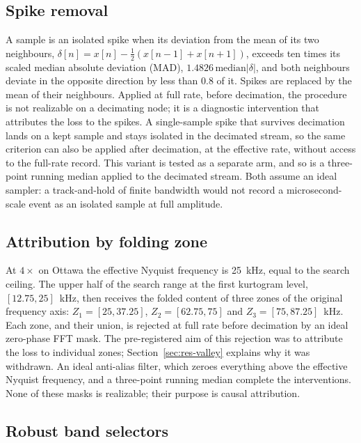 \subsection{Spike removal}
\label{sec:met-spikes}

A sample is an isolated spike when its deviation from the mean of its two neighbours,
$\delta[n] = x[n] - \tfrac12(x[n-1] + x[n+1])$, exceeds ten times
its scaled median absolute deviation (MAD), $1.4826\,\mathrm{median}|\delta|$, and both neighbours deviate in the opposite direction by less
than 0.8 of it. Spikes are replaced by the mean of their neighbours. Applied at full rate, before
decimation, the procedure is not realizable on a decimating node; it is a diagnostic intervention
that attributes the loss to the spikes. A single-sample spike that survives decimation lands on a
kept sample and stays isolated in the decimated stream, so the same criterion can also be applied
after decimation, at the effective rate, without access to the full-rate record. This variant is
tested as a separate arm, and so is a three-point running median applied to the decimated stream.
Both assume an ideal sampler: a track-and-hold of finite bandwidth would not record a
microsecond-scale event as an isolated sample at full amplitude.

\subsection{Attribution by folding zone}
\label{sec:zones}

At $4\times$ on Ottawa the effective Nyquist frequency is 25~kHz, equal to the search ceiling. The
upper half of the search range at the first kurtogram level, $[12.75, 25]$~kHz, then receives the
folded content of three zones of the original frequency axis: $Z_1 = [25, 37.25]$,
$Z_2 = [62.75, 75]$ and $Z_3 = [75, 87.25]$~kHz. Each zone, and their union, is rejected at full
rate before decimation by an ideal zero-phase FFT mask. The pre-registered aim of this rejection was
to attribute the loss to individual zones; Section~\ref{sec:res-valley} explains why it was
withdrawn. An ideal anti-alias filter, which zeroes everything above the effective Nyquist
frequency, and a three-point running median complete the interventions. None of these masks is
realizable; their purpose is causal attribution.

\subsection{Robust band selectors}

